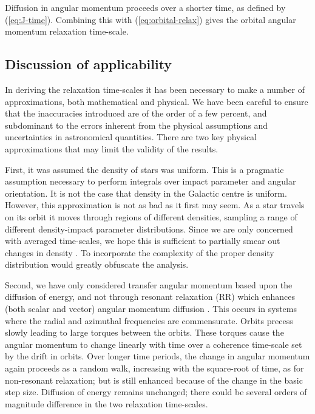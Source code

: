 \documentclass[useAMS,usedcolumn,usegraphicx,usenatbib]{mn2e}
\newcommand{\eqnref}[1]{(\ref{eq:#1})}
\begin{document}
\begin{onecolumn}
Diffusion in angular momentum proceeds over a shorter time, as defined by \eqnref{J-time}. Combining this with \eqnref{orbital-relax} gives the orbital angular momentum relaxation time-scale.

\subsection{Discussion of applicability}

In deriving the relaxation time-scales it has been necessary to make a number of approximations, both mathematical and physical. We have been careful to ensure that the inaccuracies introduced are of the order of a few percent, and subdominant to the errors inherent from the physical assumptions and uncertainties in astronomical quantities. There are two key physical approximations that may limit the validity of the results.

First, it was assumed  the density of stars was uniform. This is a pragmatic assumption necessary to perform integrals over impact parameter and angular orientation. It is not the case that density in the Galactic centre is uniform. However, this approximation is not as bad as it first may seem. As a star travels on its orbit it moves through regions of different densities, sampling a range of different density-impact parameter distributions. Since we are only concerned with averaged time-scales, we hope this is sufficient to partially smear out changes in density \citep[cf.][]{Just2011}. To incorporate the complexity of the proper density distribution would greatly obfuscate the analysis.

Second, we have only considered transfer angular momentum based upon the diffusion of energy, and not through resonant relaxation (RR) which enhances (both scalar and vector) angular momentum diffusion \citep{Rauch1996,Rauch1998,Gurkan2007,Eilon2009,Madigan2011}. This occurs in systems where the radial and azimuthal frequencies are commensurate. Orbits precess slowly leading to large torques between the orbits. These torques cause the angular momentum to change linearly with time over a coherence time-scale set by the drift in orbits. Over longer time periods, the change in angular momentum again proceeds as a random walk, increasing with the square-root of time, as for non-resonant relaxation; but is still enhanced because of the change in the basic step size. Diffusion of energy remains unchanged; there could be several orders of magnitude difference in the two relaxation time-scales.


\end{onecolumn}
\end{document}
